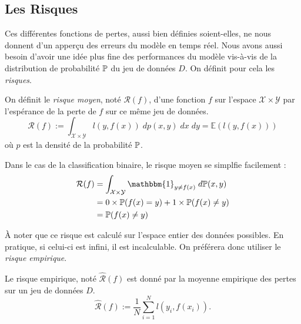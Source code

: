 \subsection{Les Risques}

Ces différentes fonctions de pertes, aussi bien définies soient-elles, ne nous donnent d'un apperçu des erreurs du modèle en temps réel. Nous avons aussi besoin d'avoir une idée plus fine des performances du modèle vis-à-vis de la distribution de probabilité $\mathbb{P}$ du jeu de données $D$. 
On définit pour cela les \emph{risques}. 

\begin{definition}
    On définit le \emph{risque moyen}, noté $ \mathcal{R}(f)$, d'une fonction $f$ sur l'espace $ \mathcal{X} \times \mathcal{Y}$ par l'espérance de la perte de $f$ sur ce même jeu de données. 
    \begin{equation}
        \boxed{\mathcal{R}(f) := \int_{ \mathcal{X} \times \mathcal{Y}} l(y, f(x)) \; dp(x, y) \; dx \; dy = \mathbb{E} \left(l(y, f(x))\right)}
    \end{equation}
    où $p$ est la densité de la probabilité $ \mathbb{P}$. 
\end{definition}

\begin{example}
    Dans le cas de la classification binaire, le risque moyen se simplfie facilement : 
    \begin{align*}
        \mathcal{R}(f) &= \int_{ \mathcal{X} \times \mathcal{Y}} \mathbbm{1}_{y \not = f(x)} \; d \myP(x,y) \\ 
        &= 0 \times \myP(f(x) = y) + 1 \times \myP(f(x) \not = y) \\ 
        &= \myP(f(x) \not = y)
    \end{align*}
\end{example}

À noter que ce risque est calculé sur l'espace entier des données possibles. En pratique, si celui-ci est infini, il est incalculable. On préférera donc utiliser le \emph{risque empirique}. 

\begin{definition}
    Le risque empirique, noté $ \hat{\mathcal{R}}(f)$ est donné par la moyenne empirique des pertes sur un jeu de données $ D$. 
    \begin{equation}
        \boxed{\hat{ \mathcal{R}}(f) := \frac{1}{N} \sum_{i=1}^{N} l(y_i, f(x_i)).}
    \end{equation}
\end{definition}

